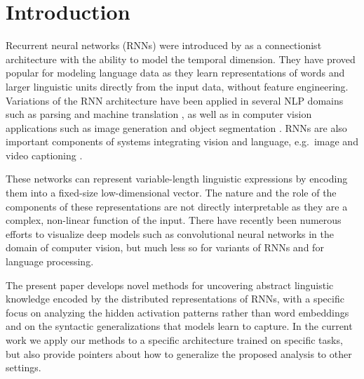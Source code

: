 
\section{Introduction}
\label{sec:intro}
Recurrent neural networks (RNNs) were introduced by
\cite{elman1990finding}
as a connectionist architecture with the
ability to model the temporal dimension. They have proved popular for
modeling language data as they learn representations of words and
larger linguistic units directly from the input data, without feature
engineering. Variations of the RNN architecture have been applied in
several NLP domains such as parsing \citep{vinyals2015grammar} and
machine translation \citep{Bahdanau2015}, as well as in computer
vision applications such as image generation \citep{gregor2015draw} and
object segmentation \citep{visin2015reseg}. RNNs are also important
components of systems integrating vision and language, e.g.\ image
\citep{karpathy2015deep} and video captioning \citep{yu2015video}.

These networks can represent variable-length linguistic expressions by
encoding them into a fixed-size low-dimensional vector. The nature and
the role of the components of these representations are not directly
interpretable as they are a complex, non-linear function of the
input. There have recently been numerous efforts to visualize deep
models such as convolutional neural networks in the domain of computer
vision, but much less so for variants of RNNs and for language
processing.

The present paper develops novel methods for uncovering abstract
linguistic knowledge encoded by the distributed representations of RNNs,
with a specific focus on analyzing the hidden activation patterns rather
than word embeddings and on the syntactic generalizations
that models learn to capture. In the current work we apply our methods
to a specific architecture trained on specific tasks, but also provide
pointers about how to generalize the proposed analysis to other settings.

